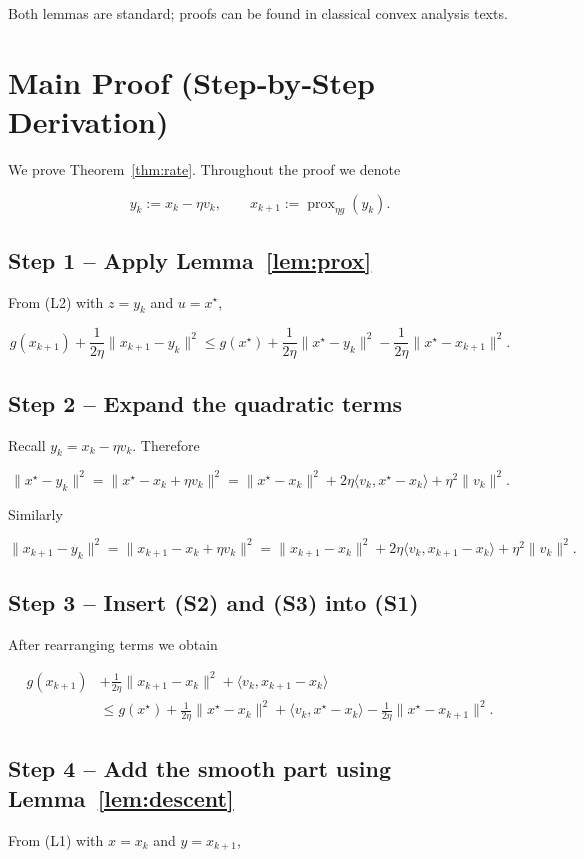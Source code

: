\documentclass{article}
\newcommand{\prox}{\operatorname{prox}}
\begin{document}
Both lemmas are standard; proofs can be found in classical convex analysis texts.

\section*{Main Proof (Step‑by‑Step Derivation)}
We prove Theorem~\ref{thm:rate}.  Throughout the proof we denote  

\[
y_k:=x_k-\eta v_k,\qquad
x_{k+1}:=\prox_{\eta g}(y_k).
\]

\subsection*{Step 1 – Apply Lemma~\ref{lem:prox}}
From (L2) with \(z=y_k\) and \(u=x^{\star}\),

\[
g(x_{k+1})+\frac{1}{2\eta}\|x_{k+1}-y_k\|^{2}
\le g(x^{\star})+\frac{1}{2\eta}\|x^{\star}-y_k\|^{2}
-\frac{1}{2\eta}\|x^{\star}-x_{k+1}\|^{2}.
\tag{S1}
\]

\subsection*{Step 2 – Expand the quadratic terms}
Recall \(y_k = x_k-\eta v_k\).  Therefore  

\[
\|x^{\star}-y_k\|^{2}
= \|x^{\star}-x_k+\eta v_k\|^{2}
= \|x^{\star}-x_k\|^{2}+2\eta\langle v_k, x^{\star}-x_k\rangle+\eta^{2}\|v_k\|^{2}.
\tag{S2}
\]

Similarly  

\[
\|x_{k+1}-y_k\|^{2}= \|x_{k+1}-x_k+\eta v_k\|^{2}
= \|x_{k+1}-x_k\|^{2}+2\eta\langle v_k, x_{k+1}-x_k\rangle+\eta^{2}\|v_k\|^{2}.
\tag{S3}
\]

\subsection*{Step 3 – Insert (S2) and (S3) into (S1)}
After rearranging terms we obtain  

\[
\begin{aligned}
g(x_{k+1}) &+ \frac{1}{2\eta}\|x_{k+1}-x_k\|^{2}
+ \langle v_k, x_{k+1}-x_k\rangle  \\
&\le g(x^{\star})
+ \frac{1}{2\eta}\|x^{\star}-x_k\|^{2}
+ \langle v_k, x^{\star}-x_k\rangle
- \frac{1}{2\eta}\|x^{\star}-x_{k+1}\|^{2}.
\end{aligned}
\tag{S4}
\]

\subsection*{Step 4 – Add the smooth part using Lemma~\ref{lem:descent}}
From (L1) with \(x=x_k\) and \(y=x_{k+1}\),
\end{document}
